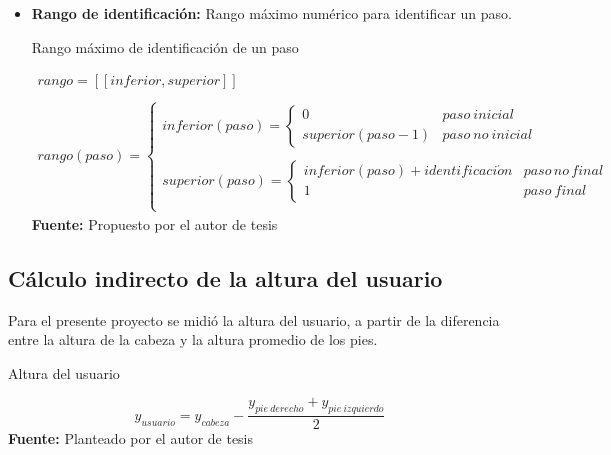 \begin{itemize}
\item \textbf{Rango de identificaci\'on:} Rango m\'aximo num\'erico para identificar un paso.
\begin{formula}[H]
	\centering
	\caption{Rango m\'aximo de identificaci\'on de un paso}
	\label{frm:idenStep}
	\begin{equation}
\begin{matrix}
rango = [[inferior,superior]] \\
\\
rango(paso)=\left\{\begin{matrix}
inferior(paso)= \left\{\begin{matrix}
0 & paso\: inicial\\ 
superior(paso-1) & paso\: no\: inicial
\end{matrix}\right.\\ 
\\
superior(paso)= \left\{\begin{matrix}
inferior(paso)+identificaci\acute{o}n & paso\, no\, final\\ 
1 & paso\: final

\end{matrix}\right.\\ 
\end{matrix}\right.
\end{matrix}
	\end{equation}
	\textbf{Fuente:} Propuesto por el autor de tesis
\end{formula} 
\end{itemize}
\subsection{C\'alculo indirecto de la altura del usuario} \label{dis:height}
Para el presente proyecto se midi\'o la altura del usuario, a partir de la diferencia entre la altura de la cabeza y la altura promedio de los pies.
	\begin{formula}[H]
	\centering
	\caption{Altura del usuario}
	\label{frm:alturaUser}
	\begin{equation}
y_{usuario}=y_{cabeza}-\frac{y_{pie \: derecho}+y_{pie \: izquierdo}}{2}
	\end{equation}
			\textbf{Fuente:} Planteado por el autor de tesis
\end{formula} 
